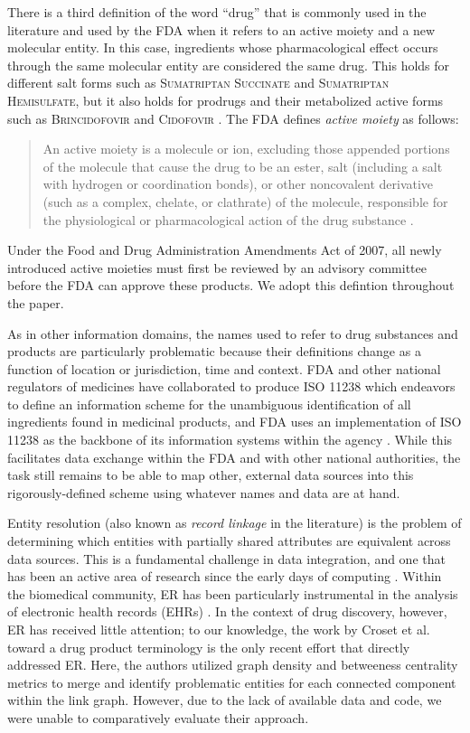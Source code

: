 \documentclass{bmcart}
\begin{document}
There is a third definition of the word ``drug'' that is commonly used in
the literature and used by the FDA when it refers to an active moiety
and a new molecular entity. In this case, ingredients whose
pharmacological effect occurs through the same molecular entity are
considered the same drug. This holds for different salt forms such as
\textsc{Sumatriptan Succinate} and \textsc{Sumatriptan Hemisulfate},
but it also holds for prodrugs and their metabolized active forms such
as \textsc{Brincidofovir} and \textsc{Cidofovir} \cite{NME}. The FDA
defines \emph{active moiety} as follows:
\begin{quote}An active moiety is a molecule or
ion, excluding those appended portions of the molecule that cause the
drug to be an ester, salt (including a salt with hydrogen or
coordination bonds), or other noncovalent derivative (such as a
complex, chelate, or clathrate) of the molecule, responsible for the
physiological or pharmacological action of the drug
substance \cite{CFR2012}.
\end{quote}
Under the Food and Drug Administration
Amendments Act of 2007, all newly introduced active moieties must
first be reviewed by an advisory committee before the FDA can approve
these products. We adopt this defintion throughout the paper.

As in other information domains, the names used to refer to drug
substances and products are particularly problematic because their
definitions change as a function of location or jurisdiction, time and
context. FDA and other national regulators of medicines have
collaborated to produce ISO 11238 \cite{ISO11238} which endeavors to
define an information scheme for the unambiguous identification of all
ingredients found in medicinal products, and FDA uses an
implementation of ISO 11238 as the backbone of its information systems
within the agency \cite{GSRS}. While this facilitates data exchange within
the FDA and with other national authorities, the task still remains to
be able to map other, external data sources into this
rigorously-defined scheme using whatever names and data are at hand. 

Entity resolution (also known as \emph{record linkage} in the
literature) is the problem of determining which entities with
partially shared attributes are equivalent across data sources. This
is a fundamental challenge in data integration, and one that has been
an active area of research since the early days of computing
\cite{Newcombe1959}. Within the biomedical community, ER has been
particularly instrumental in the analysis of electronic health records
(EHRs) \cite{Karr2019}. In the context of drug discovery, however, ER
has received little attention; to our knowledge, the work by Croset
et al. toward a drug product terminology \cite{Croset2015} is the only
recent effort that directly addressed ER. Here, the authors utilized
graph density and betweeness centrality metrics to merge and identify 
problematic entities for each connected component within the link
graph. However, due to the lack of available data and code, we were
unable to comparatively evaluate their approach.
\end{document}
